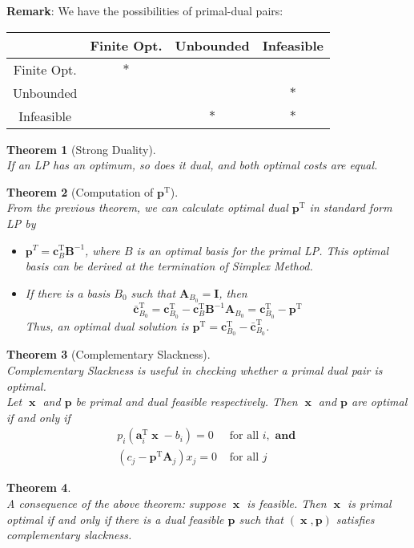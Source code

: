 \documentclass[12pt]{article}
\newcommand{\T}{\mathrm{T}}
\newtheorem{theorem}{Theorem}[section]
\theoremstyle{definition}
\DeclareMathOperator{\x}{\mathbf{x}}
\begin{document}
\textbf{Remark}: We have the possibilities of primal-dual pairs:
\begin{table}[h]
\centering
\begin{tabular}{c|c|c|c}
            &Finite Opt.  &Unbounded    &Infeasible\\\hline
Finite Opt. &$\ast$       &             &          \\\hline
Unbounded   &             &             &$\ast$    \\\hline
Infeasible  &             &$\ast$       &$\ast$    
\end{tabular}
\end{table}
\begin{theorem}[Strong Duality]
\hfill\\\normalfont If an LP has an optimum, so does it dual, and both optimal costs are equal.
\end{theorem}
\begin{theorem}[Computation of {$\mathbf{p}^\T$}]
\hfill\\\normalfont From the previous theorem, we can calculate optimal dual $\mathbf{p}^\T$ in standard form LP by
\begin{itemize}
  \item $\mathbf{p}^T = \mathbf{c}_B^\T\mathbf{B}^{-1}$, where $B$ is an optimal basis for the primal LP. This optimal basis can be derived at the termination of Simplex Method.
  \item If there is a basis $B_0$ such that $\mathbf{A}_{B_0}=\mathbf{I}$, then
  \[
\bar{\mathbf{c}}_{B_0}^\T = \mathbf{c}_{B_0}^\T - \mathbf{c}_B^\T\mathbf{B}^{-1}\mathbf{A}_{B_0} =  \mathbf{c}_{B_0}^\T - \mathbf{p}^\T
  \]
  Thus, an optimal dual solution is $\mathbf{p}^\T = \mathbf{c}_{B_0}^\T - \bar{\mathbf{c}}_{B_0}^\T$.
\end{itemize}
\end{theorem}
\begin{theorem}[Complementary Slackness]
\hfill\\\normalfont Complementary Slackness is useful in checking whether a primal dual pair is optimal.\\
Let $\x$ and $\mathbf{p}$ be primal and dual feasible respectively. Then $\x$ and $\mathbf{p}$ are optimal if and only if
\begin{align*}
p_i(\mathbf{a}_i^\T\x-b_i)=0 &\text{ for all }i, \textbf{ and }\\
(c_j-\mathbf{p}^\T\mathbf{A}_j)x_j=0 &\text{ for all } j
\end{align*}
\end{theorem}
\begin{theorem}
\hfill\\\normalfont A consequence of the above theorem: suppose $\x$ is feasible. Then $\x$ is primal optimal if and only if there is a dual feasible $\mathbf{p}$ such that $(\x, \mathbf{p})$ satisfies complementary slackness.
\end{theorem}
\end{document}
